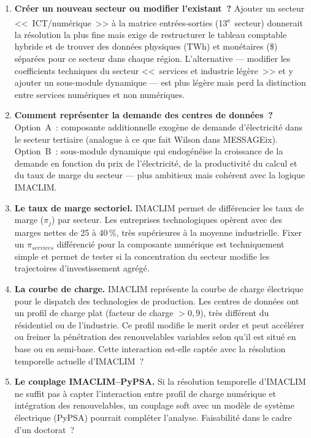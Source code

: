 \begin{enumerate}
\item \textbf{Créer un nouveau secteur ou modifier l'existant~?} Ajouter un secteur <<~ICT/numérique~>> à la matrice entrées-sorties (13\textsuperscript{e}~secteur) donnerait la résolution la plus fine mais exige de restructurer le tableau comptable hybride et de trouver des données physiques (TWh) et monétaires (\$) séparées pour ce secteur dans chaque région. L'alternative --- modifier les coefficients techniques du secteur <<~services et industrie légère~>> et y ajouter un sous-module dynamique --- est plus légère mais perd la distinction entre services numériques et non numériques.

\item \textbf{Comment représenter la demande des centres de données~?} Option~A~: composante additionnelle exogène de demande d'électricité dans le secteur tertiaire (analogue à ce que fait Wilson dans MESSAGEix). Option~B~: sous-module dynamique qui endogénéise la croissance de la demande en fonction du prix de l'électricité, de la productivité du calcul et du taux de marge du secteur --- plus ambitieux mais cohérent avec la logique IMACLIM.

\item \textbf{Le taux de marge sectoriel.} IMACLIM permet de différencier les taux de marge ($\pi_j$) par secteur. Les entreprises technologiques opèrent avec des marges nettes de 25 à 40\,\%, très supérieures à la moyenne industrielle. Fixer un $\pi_{services}$ différencié pour la composante numérique est techniquement simple et permet de tester si la concentration du secteur modifie les trajectoires d'investissement agrégé.

\item \textbf{La courbe de charge.} IMACLIM représente la courbe de charge électrique pour le dispatch des technologies de production. Les centres de données ont un profil de charge plat (facteur de charge $>0{,}9$), très différent du résidentiel ou de l'industrie. Ce profil modifie le merit order et peut accélérer ou freiner la pénétration des renouvelables variables selon qu'il est situé en base ou en semi-base. Cette interaction est-elle captée avec la résolution temporelle actuelle d'IMACLIM~?

\item \textbf{Le couplage IMACLIM--PyPSA.} Si la résolution temporelle d'IMACLIM ne suffit pas à capter l'interaction entre profil de charge numérique et intégration des renouvelables, un couplage soft avec un modèle de système électrique (PyPSA) pourrait compléter l'analyse. Faisabilité dans le cadre d'un doctorat~?


\end{enumerate}
